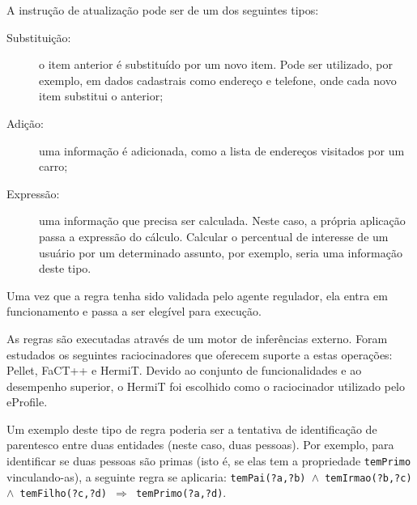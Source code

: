 A instrução de atualização pode ser de um dos seguintes tipos:

\begin{description}

  \item[Substituição:] o item anterior é substituído por um novo item. Pode ser utilizado, por exemplo, em dados cadastrais como endereço e telefone, onde cada novo item substitui o anterior;

  \item[Adição:] uma informação é adicionada, como a lista de endereços visitados por um carro;

  \item[Expressão:] uma informação que precisa ser calculada. Neste caso, a própria aplicação passa a expressão do cálculo. Calcular o percentual de interesse de um usuário por um determinado assunto, por exemplo, seria uma informação deste tipo.

\end{description}

Uma vez que a regra tenha sido validada pelo agente regulador, ela entra em funcionamento e passa a ser elegível para execução.

As regras são executadas através de um motor de inferências externo. Foram estudados os seguintes raciocinadores que oferecem suporte a estas operações: Pellet\cite{sirin05}, FaCT++\cite{tsarkov06} e HermiT\cite{motik09}. Devido ao conjunto de funcionalidades e ao desempenho superior, o HermiT foi escolhido como o raciocinador utilizado pelo eProfile.

Um exemplo deste tipo de regra poderia ser a tentativa de identificação de parentesco entre duas entidades (neste caso, duas pessoas). Por exemplo, para identificar se duas pessoas são primas (isto é, se elas tem a propriedade \texttt{temPrimo} vinculando-as), a seguinte regra se aplicaria: \texttt{temPai(?a,?b) $\wedge$ temIrmao(?b,?c) $\wedge$ temFilho(?c,?d) $\Rightarrow$ temPrimo(?a,?d)}.
